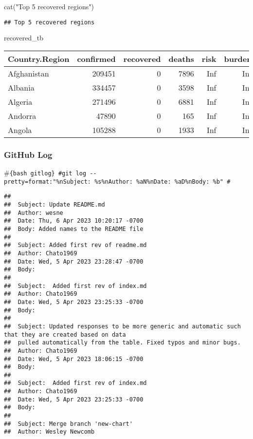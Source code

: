 \documentclass[
]{article}
\newenvironment{Shaded}{\begin{snugshade}}{\end{snugshade}}
\newcommand{\FunctionTok}[1]{\textcolor[rgb]{0.00,0.00,0.00}{#1}}
\newcommand{\NormalTok}[1]{#1}
\newcommand{\StringTok}[1]{\textcolor[rgb]{0.31,0.60,0.02}{#1}}
\begin{document}
\begin{Shaded}
\begin{Highlighting}[]
\FunctionTok{cat}\NormalTok{(}\StringTok{"Top 5 recovered regions"}\NormalTok{)}
\end{Highlighting}
\end{Shaded}

\begin{verbatim}
## Top 5 recovered regions
\end{verbatim}

\begin{Shaded}
\begin{Highlighting}[]
\NormalTok{recovered\_tb}
\end{Highlighting}
\end{Shaded}

\begin{tabular}{l|r|r|r|r|r}
\hline
Country.Region & confirmed & recovered & deaths & risk & burden\\
\hline
Afghanistan & 209451 & 0 & 7896 & Inf & Inf\\
\hline
Albania & 334457 & 0 & 3598 & Inf & Inf\\
\hline
Algeria & 271496 & 0 & 6881 & Inf & Inf\\
\hline
Andorra & 47890 & 0 & 165 & Inf & Inf\\
\hline
Angola & 105288 & 0 & 1933 & Inf & Inf\\
\hline
\end{tabular}

\hypertarget{github-log}{%
\subsubsection{GitHub Log}\label{github-log}}

\#\texttt{\{bash\ gitlog\}\ \#git\ log\ -\/-pretty=format:"\%nSubject:\ \%s\%nAuthor:\ \%aN\%nDate:\ \%aD\%nBody:\ \%b"\ \#}

\begin{verbatim}
## 
##  Subject: Update README.md 
##  Author: wesne 
##  Date: Thu, 6 Apr 2023 10:20:17 -0700 
##  Body: Added names to the README file 
## 
##  Subject: Added first rev of readme.md 
##  Author: Chato1969 
##  Date: Wed, 5 Apr 2023 23:28:47 -0700 
##  Body: 
## 
##  Subject:  Added first rev of index.md 
##  Author: Chato1969 
##  Date: Wed, 5 Apr 2023 23:25:33 -0700 
##  Body: 
## 
##  Subject: Updated responses to be more generic and automatic such that they are created based on data 
##  pulled automatically from the table. Fixed typos and minor bugs. 
##  Author: Chato1969 
##  Date: Wed, 5 Apr 2023 18:06:15 -0700 
##  Body: 
## 
##  Subject:  Added first rev of index.md 
##  Author: Chato1969 
##  Date: Wed, 5 Apr 2023 23:25:33 -0700 
##  Body: 
## 
##  Subject: Merge branch 'new-chart' 
##  Author: Wesley Newcomb
\end{verbatim}
\end{document}
